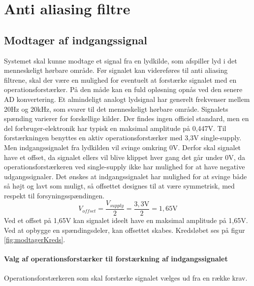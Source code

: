 \chapter{Anti aliasing filtre}\label{kap:aafiltre}
\vspace*{.5cm}

\section{Modtager af indgangssignal}
Systemet skal kunne modtage et signal fra en lydkilde, som afspiller lyd i det menneskeligt hørbare område. 
Før signalet kan videreføres til anti aliasing filtrene, skal der være en mulighed for eventuelt at forstærke signalet med en operationsforstærker. 
På den måde kan en fuld opløsning opnås ved den senere AD konvertering. 
\newline
Et almindeligt analogt lydsignal har generelt frekvenser mellem 20Hz og 20kHz, som svarer til det menneskeligt hørbare område. 
Signalets spænding varierer for forskellige kilder. 
Der findes ingen officiel standard, men en del forbruger-elektronik har typisk en maksimal amplitude på 0,447V.\cite{wikiLine} 
\newline
Til forstærkningen benyttes en aktiv operationsforstærker med 3,3V single-supply. 
Men indgangssignalet fra lydkilden vil svinge omkring 0V. 
Derfor skal signalet have et offset, da signalet ellers vil blive klippet hver gang det går under 0V, da operationsforstærkeren ved single-supply ikke har mulighed for at have negative udgangssignaler. 
Det ønskes at indgangssignalet har mulighed for at svinge både så højt og lavt som muligt, så offsettet designes til at være symmetrisk, med respekt til  forsyningsspændingen. 
\begin{equation}
	{V_{offset}} = \frac{V_{supply}}{2} = \frac{3,3\text{V}}{2} = 1,65\text{V}
\end{equation}
Ved et offset på 1,65V kan signalet ideelt have en maksimal amplitude på 1,65V. 
Ved at opbygge en spændingsdeler, kan offsettet skabes. Kredsløbet ses på figur \ref{fig:modtagerKreds}.

\subsubsection{Valg af operationsforstærker til forstærkning af indgangssignalet}
Operationsforstærkeren som skal forstærke signalet vælges ud fra en række krav. 

